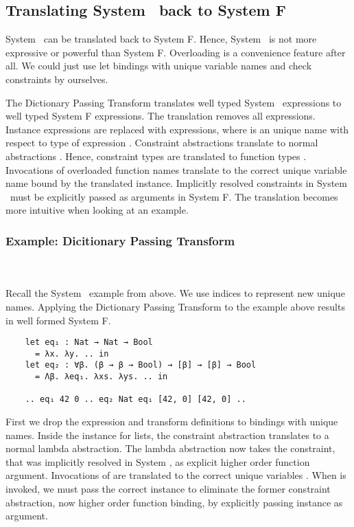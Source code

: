 \subsection{Translating System \Fo\ back to System F}
System \Fo\ can be translated back to System F. Hence, System \Fo\ is not more expressive or powerful than System F. Overloading is a convenience feature after all. We could just use let bindings with unique variable names and check constraints by ourselves.

\noindent The Dictionary Passing Transform translates well typed System \Fo\ expressions to well typed System F expressions.
The translation removes all  expressions. Instance expressions  are replaced with  expressions, where  is an unique name with respect to type  of expression . 
Constraint abstractions  translate to normal abstractions . 
Hence, constraint types  are translated to function types . 
Invocations of overloaded function names  translate to the correct unique variable name  bound by the translated instance.
Implicitly resolved constraints in System \Fo\ must be explicitly passed as arguments in System F. The translation becomes more intuitive when looking at an example.

\subsubsection{Example: Dicitionary Passing Transform}\hfill\\\\
Recall the System \Fo\ example from above. We use indices to represent new unique names.
Applying the Dictionary Passing Transform to the example above results in well formed System F.
\begin{verbatim}
    let eq₁ : Nat → Nat → Bool 
      = λx. λy. .. in
    let eq₂ : ∀β. (β → β → Bool) → [β] → [β] → Bool 
      = Λβ. λeq₁. λxs. λys. .. in
    
    .. eq₁ 42 0 .. eq₂ Nat eq₁ [42, 0] [42, 0] .. 
\end{verbatim}
First we drop the \inl{|\Decl|}expression and transform \inl{|\Inst|}definitions to  bindings with unique names. 
Inside the instance for lists, the constraint abstraction translates to a normal lambda abstraction. The lambda abstraction now takes the constraint, that was implicitly resolved in System \Fo, as explicit higher order function argument.
Invocations of  are translated to the correct unique variables .
When  is invoked, we must pass the correct instance to eliminate the former constraint abstraction, now higher order function binding, by explicitly passing instance  as argument.
